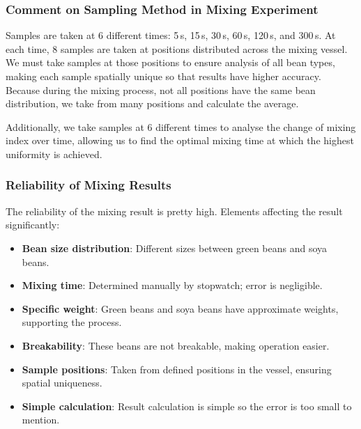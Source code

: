 \subsubsection{Comment on Sampling Method in Mixing Experiment}

Samples are taken at 6 different times: 5\,s, 15\,s, 30\,s, 60\,s, 120\,s, and 300\,s. At each time, 8 samples are taken at positions distributed across the mixing vessel. We must take samples at those positions to ensure analysis of all bean types, making each sample spatially unique so that results have higher accuracy. Because during the mixing process, not all positions have the same bean distribution, we take from many positions and calculate the average.

Additionally, we take samples at 6 different times to analyse the change of mixing index over time, allowing us to find the optimal mixing time at which the highest uniformity is achieved.

\subsubsection{Reliability of Mixing Results}

The reliability of the mixing result is pretty high. Elements affecting the result significantly:
\begin{itemize}
    \item \textbf{Bean size distribution}: Different sizes between green beans and soya beans.
    \item \textbf{Mixing time}: Determined manually by stopwatch; error is negligible.
    \item \textbf{Specific weight}: Green beans and soya beans have approximate weights, supporting the process.
    \item \textbf{Breakability}: These beans are not breakable, making operation easier.
    \item \textbf{Sample positions}: Taken from defined positions in the vessel, ensuring spatial uniqueness.
    \item \textbf{Simple calculation}: Result calculation is simple so the error is too small to mention.
\end{itemize}

